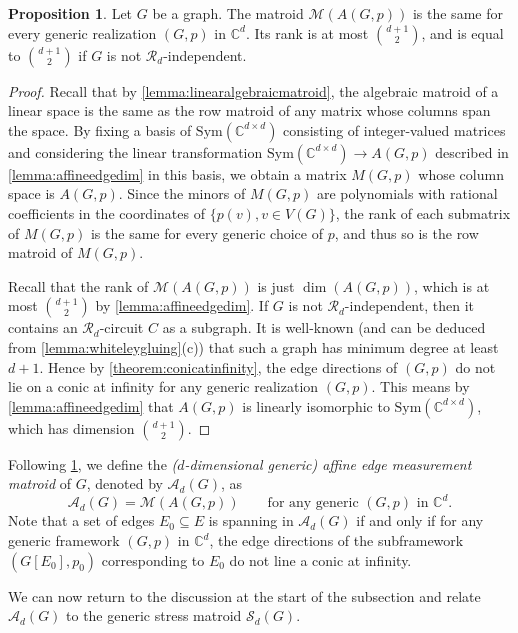 \documentclass[11pt,a4paper,dvipsnames]{scrartcl}
\theoremstyle{definition}
\newtheorem{proposition}[theorem]{Proposition}
\newcommand{\CC}{\mathbb{C}}
\newcommand{\algmat}[1]{\mathcal{M}(#1)}
\newcommand{\stressmatroid}[2]{\mathcal{S}_{#1}(#2)}
\newcommand{\affinematroid}[2]{\mathcal{A}_{#1}(#2)}
\newcommand{\sym}[1]{\text{Sym}(\CC^{#1 \times #1})}
\newcommand{\affineedge}[2]{A(#1,#2)}
\begin{document}
\begin{proposition}\label{lemma:affinematroid}
    Let $G$ be a graph. The matroid $\algmat{\affineedge{G}{p}}$ is the same for every generic realization $(G,p)$ in $\CC^d$. Its rank is at most $\binom{d+1}{2}$, and is equal to $\binom{d+1}{2}$ if $G$ is not $\mathcal{R}_d$-independent.
\end{proposition}
\begin{proof}
    Recall that by \cref{lemma:linearalgebraicmatroid}, the algebraic matroid of a linear space is the same as the row matroid of any matrix whose columns span the space. By fixing a basis of $\sym{d}$ consisting of integer-valued matrices and considering the linear transformation $\sym{d} \rightarrow \affineedge{G}{p}$ described in \cref{lemma:affineedgedim} in this basis, we obtain a matrix $M(G,p)$ whose column space is $\affineedge{G}{p}$. Since the minors of $M(G,p)$ are polynomials with rational coefficients in the coordinates of $\{p(v), v \in V(G)\}$, the rank of each submatrix of $M(G,p)$ is the same for every generic choice of $p$, and thus so is the row matroid of $M(G,p)$.   
    
    Recall that the rank of $\algmat{\affineedge{G}{p}}$ is just $\dim(\affineedge{G}{p})$, which is at most $\binom{d+1}{2}$ by \cref{lemma:affineedgedim}.  If $G$ is not $\mathcal{R}_d$-independent, then it contains an $\mathcal{R}_d$-circuit $C$ as a subgraph. It is well-known (and can be deduced from \cref{lemma:whiteleygluing}(c)) that such a graph has minimum degree at least $d+1$. Hence by \cref{theorem:conicatinfinity}, the edge directions of $(G,p)$ do not lie on a conic at infinity for any generic realization $(G,p)$. This means by \cref{lemma:affineedgedim} that $\affineedge{G}{p}$ is linearly isomorphic to $\sym{d}$, which has dimension $\binom{d+1}{2}$.
\end{proof}

Following \cref{lemma:affinematroid}, we define the \emph{($d$-dimensional generic) affine edge measurement matroid} of $G$, denoted by $\affinematroid{d}{G}$, as \[\affinematroid{d}{G} = \algmat{\affineedge{G}{p}} \hspace{2em} \text{for any generic } (G,p) \text{ in } \CC^d.\] 
Note that a set of edges $E_0 \subseteq E$ is spanning in $\affinematroid{d}{G}$ if and only if for any generic framework $(G,p)$ in $\CC^d$, the edge directions of the subframework $(G[E_0],p_0)$ corresponding to $E_0$ do not line a conic at infinity.

We can now return to the discussion at the start of the subsection and relate $\affinematroid{d}{G}$ to the generic stress matroid $\stressmatroid{d}{G}$.
\end{document}

